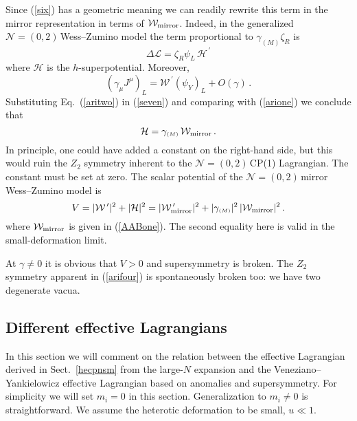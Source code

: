 \documentclass[epsfig,12pt]{article}
\def\beq{\begin{equation}}
\def\eeq{\end{equation}}
\newcommand{\nzt}{${\mathcal N}=(0,2)\,$}
\newcommand{\cell}{{\mathcal L}}
\newcommand{\cw}{{\mathcal W}}
\def\beq{\begin{equation}}
\def\eeq{\end{equation}}
\newcommand{\ssm}{{\scriptscriptstyle(M)}}
\begin{document}
{Since (\ref{six}) has a geometric meaning we can readily rewrite this term in the mirror representation in terms of 
${\mathcal W}_{\rm mirror}$.
 Indeed, in the generalized \nzt Wess--Zumino model the term proportional to $\gamma_\ssm \zeta_R$ is
 \cite{SYneww}
 \beq
 \Delta\cell = \zeta_R \psi_L\,{\mathcal H}^{\,\prime}
 \label{arione}
 \eeq
 where ${\mathcal H}$ is the $h$-superpotential. Moreover,
 \beq
 \left(\gamma_\mu J^\mu\right)_L = {\mathcal W}^{\,\prime} \left(\psi_Y\right)_{L} +O(\gamma)\,.
  \label{aritwo}
 \eeq
Substituting Eq.~(\ref{aritwo}) in (\ref{seven}) and comparing with (\ref{arione}) we conclude that
\beq
{\mathcal H} = \gamma_\ssm\,{\mathcal W}_{\rm mirror}\,.
  \label{arithree}
 \eeq
 In principle, one could have added a constant on the right-hand side, but this would ruin the $Z_2$ 
 symmetry inherent to the \nzt CP(1) Lagrangian. The constant must be set at zero. 
 The scalar potential of the \nzt mirror Wess--Zumino model 
  is \cite{SYneww}
 \beq
 V= |\cw^{\,\prime} |^2+|\mathcal H|^2 = |\cw^{\,\prime}_{\rm mirror} |^2 +|\gamma_\ssm |^2\,|\cw_{\rm mirror} |^2\,.
   \label{arifour}
 \eeq
 where $\cw_{\rm mirror} $ is given in (\ref{AABone}).
 The second equality here is valid in the small-deformation limit.
 
At $\gamma \neq 0$ it is obvious that $V>0$ and supersymmetry is broken.
The $Z_2$ symmetry apparent in (\ref{arifour}) is spontaneously broken too:
we have two degenerate vacua.



\subsection{Different effective Lagrangians}
\label{defefl}

In this section we will comment on the relation between the
effective Lagrangian derived in Sect.~\ref{hecpnsm} from the large-$N$ expansion
 and the Veneziano--Yankielowicz
effective Lagrangian based on  anomalies and supersymmetry.
For simplicity we will set $m_i =0$ in this section. 
Generalization to  $m_i \neq 0$ is straightforward. We  assume the heterotic deformation to be small, $u\ll1$.

}
\end{document}
